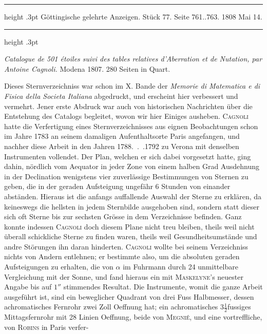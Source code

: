 \par\bigskip
{}
\hypertarget{native-501-lower}{}\label{native-501-lower}
\begin{center}\parbox{.85\linewidth}{\centering\small
\hrule height .3pt\relax\vspace{2.5pt}
Göttingische gelehrte Anzeigen. Stück 77. Seite 761..763. 1808 Mai 14.\par
\vspace{2.5pt}\hrule height .3pt\relax
}\end{center}

\emph{Catalogue de \textup{501} étoiles suivi des tables relatives d'Aberration et de Nutation, par Antoine Cagnoli.} Modena 1807. 280 Seiten in Quart.

Dieses Sternverzeichniss war schon im X. Bande der \emph{Memorie di Matematica e di Fisica della Societa Italiana} abgedruckt, und erscheint hier verbessert und vermehrt. Jener erste Abdruck war auch von historischen Nachrichten über die Entstehung des Catalogs begleitet, wovon wir hier Einiges ausheben. \textsc{Cagnoli} hatte die Verfertigung eines Sternverzeichnisses aus eignen Beobachtungen schon im Jahre 1783 an seinem damaligen Aufenthaltsorte Paris angefangen, und nachher diese Arbeit in den Jahren 1788\mbox{. . .}1792 zu Verona mit denselben Instrumenten vollendet. Der Plan, welchen er sich dabei vorgesetzt hatte, ging dahin, nördlich vom Aequator in jeder Zone von einem halben Grad Ausdehnung in der Declination wenigstens vier zuverlässige Bestimmungen von Sternen zu geben, die in der geraden Aufsteigung ungefähr 6 Stunden von einander abständen. Hieraus ist die anfangs auffallende Auswahl der Sterne zu erklären, da keineswegs die hellsten in jedem Sternbilde ausgehoben sind, sondern statt dieser sich oft Sterne bis zur sechsten Grösse in dem Verzeichnisse befinden. Ganz konnte indessen \textsc{Cagnoli} doch diesem Plane nicht treu bleiben, theils weil nicht überall schickliche Sterne zu finden waren, theils weil Gesundheitsumstände und andre Störungen ihn daran hinderten. \textsc{Cagnoli} wollte bei seinem Verzeichniss nichts von Andern entlehnen; er bestimmte also, um die absoluten geraden Aufsteigungen zu erhalten, die von $\alpha$ im Fuhrmann durch 24 unmittelbare Vergleichung mit der Sonne, und fand hieraus ein mit \textsc{Maskelyne}'s neuester Angabe bis auf $1''$ stimmendes Resultat. Die Instrumente, womit die ganze Arbeit ausgeführt ist, sind ein beweglicher Quadrant von drei Fuss Halbmesser, dessen achromatisches Fernrohr zwei Zoll Oeffnung hat; ein achromatisches 3$\frac{1}{2}$fussiges Mittagsfernrohr mit 28 Linien Oeffnung, beide von \textsc{Megnié}, und eine vortreffliche, von \textsc{Robins} in Paris verfer-\par
